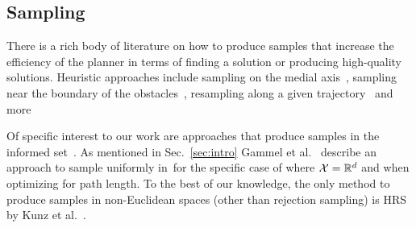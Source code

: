 \documentclass[letterpaper, 10 pt, conference]{ieeeconf}  %
\begin{document}
%


\subsection{Sampling}
\label{subsec:sampling}
There is a rich body of literature on how to produce samples that increase the efficiency of the planner in terms of finding a solution or producing high-quality solutions.
Heuristic approaches include
sampling on the medial axis~\cite{WAS99a, WAS99b, LTA03, YDLTA14},
sampling near the boundary of the obstacles~\cite{ABDJV98, YTEA12},
resampling along a given trajectory~\cite{APD11, AS11}
and more~\cite{US03, SWT09}

Of specific interest to our work are approaches that produce samples in the informed set~\Cinf.
As mentioned in Sec.~\ref{sec:intro} Gammel et al.~\cite{GSB14} describe an approach to sample uniformly in~\Cinf for the specific case of where $\mathcal{X} = \mathbb{R}^d$ and when optimizing for path length.
To the best of our knowledge, the only method to produce samples in non-Euclidean spaces (other than rejection sampling) is HRS by Kunz et al.~\cite{KTC16}.
\end{document}
